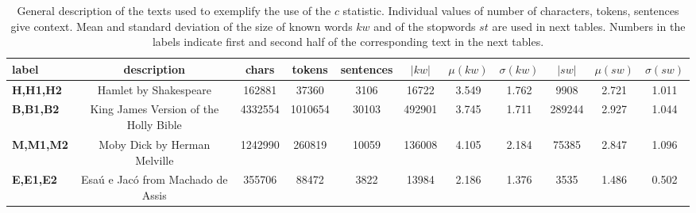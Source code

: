 \begin{table*}[h!]
\begin{center}
\begin{tabular}{| l || c | c | c | c | c | c | c | c | c | c |}\hline
label & description & chars & tokens & sentences & $|kw|$ & $\mu(kw)$ & $\sigma(kw)$ & $|sw|$ & $\mu(sw)$ & $\sigma(sw)$ \\\hline\hline
{\bf H,H1,H2} & Hamlet by Shakespeare & 162881 & 37360 & 3106 & 16722 & 3.549 & 1.762 & 9908 & 2.721 & 1.011 \\\hline
{\bf B,B1,B2} & King James Version of the Holly Bible & 4332554 & 1010654 & 30103 & 492901 & 3.745 & 1.711 & 289244 & 2.927 & 1.044 \\\hline
{\bf M,M1,M2} & Moby Dick by Herman Melville & 1242990 & 260819 & 10059 & 136008 & 4.105 & 2.184 & 75385 & 2.847 & 1.096 \\\hline
{\bf E,E1,E2} & Esa\'u e Jac\'o from Machado de Assis & 355706 & 88472 & 3822 & 13984 & 2.186 & 1.376 & 3535 & 1.486 & 0.502 \\\hline
\end{tabular}
\caption{General description of the texts used to exemplify the use of the $c$ statistic.
Individual values of number of characters, tokens, sentences give context.
Mean and standard deviation of the size of known words $kw$ and of the stopwords
$st$ are used in next tables.
Numbers in the labels indicate first and second half of the corresponding text in the next tables.}
\end{center}
\end{table*}